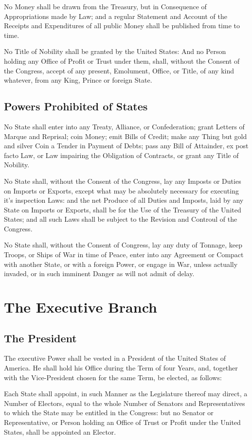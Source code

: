 \documentclass{constitution}
\begin{document}
No Money shall be drawn from the Treasury,
but in Consequence of Appropriations made by Law;
and a regular Statement and Account
of the Receipts and Expenditures of all public Money
shall be published from time to time.

No Title of Nobility shall be granted by the United States:
And no Person holding any Office of Profit or Trust under them, shall,
without the Consent of the Congress,
accept of any present, Emolument, Office, or Title, of any kind whatever,
from any King, Prince or foreign State.

\section{Powers Prohibited of States}
No State shall enter into any Treaty, Alliance, or Confederation;
grant Letters of Marque and Reprisal;
coin Money;
emit Bills of Credit;
make any Thing but gold and silver Coin a Tender in Payment of Debts;
pass any Bill of Attainder,
ex post facto Law,
or Law impairing the Obligation of Contracts,
or grant any Title of Nobility.

No State shall, without the Consent of the Congress,
lay any Imposts or Duties on Imports or Exports,
except what may be absolutely necessary for executing it's inspection Laws:
and the net Produce of all Duties and Imposts,
laid by any State on Imports or Exports,
shall be for the Use of the Treasury of the United States;
and all such Laws shall be subject to the Revision and Controul of the Congress.

No State shall, without the Consent of Congress,
lay any duty of Tonnage,
keep Troops, or Ships of War in time of Peace,
enter into any Agreement or Compact with another State, or with a foreign Power,
or engage in War, unless actually invaded,
or in such imminent Danger as will not admit of delay.

\chapter{The Executive Branch}
\section{The President}
The executive Power shall be vested in a President of the United States of America.
He shall hold his Office during the Term of four Years,
and, together with the Vice-President chosen for the same Term,
be elected, as follows:

Each State shall appoint,
in such Manner as the Legislature thereof may direct,
a Number of Electors, equal to the whole Number of Senators and Representatives
to which the State may be entitled in the Congress:
but no Senator or Representative,
or Person holding an Office of Trust or Profit under the United States,
shall be appointed an Elector.
\end{document}
